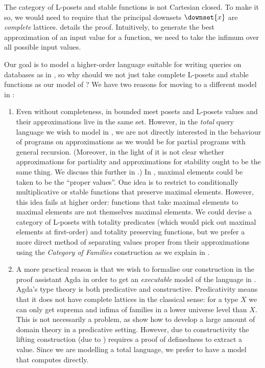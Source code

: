 The category of L-posets and stable functions is not Cartesian
closed. To make it so, we would need to require that the principal
downsets $\downset{x}$ are \emph{complete} lattices. \citet[Theorem
12.5.10]{amadio-curien} details the proof. Intuitively, to generate
the best approximation of an input value for a function, we need to
take the infimum over all possible input values.

Our goal is to model a higher-order language suitable for writing
queries on databases as in , so why should
we not just take complete L-posets and stable functions as our model
of \GPS?  We have two reasons for moving to a different model in
:

\begin{enumerate}[leftmargin=*]
\item Even without completeness, in bounded meet posets and L-posets
  values and their approximations live in the same set. However, in
  the \emph{total} query language we wish to model in
  , we are not directly interested in the behaviour
  of programs on approximations as we would be for partial programs
  with general recursion. (Moreover, in the light of
   it is not clear whether
  approximations for partiality and approximations for stability ought
  to be the same thing. We discuss this further in
  .) In ,
  maximal elements could be taken to be the ``proper values''. One
  idea is to restrict to conditionally multiplicative or stable
  functions that preserve maximal elements. However, this idea fails
  at higher order: functions that take maximal elements to maximal
  elements are not themselves maximal elements. We could devise a
  category of L-posets with totality predicates (which would pick out
  maximal elements at first-order) and totality preserving functions,
  but we prefer a more direct method of separating values proper from
  their approximations using the \emph{Category of Families}
  construction as we explain in .
\item A more practical reason is that we wish to formalise our
  construction in the proof assistant Agda \cite{agda} in order to get
  an \emph{executable} model of the language in
  . Agda's type theory is both predicative and
  constructive. Predicativity means that it does not have complete
  lattices in the classical sense: for a type $X$ we can only get
  suprema and infima of families in a lower universe level than
  $X$. This is not necessarily a problem, as \citet{dejong21} show how
  to develop a large amount of domain theory in a predicative
  setting. However, due to constructivity the lifting construction
  (due to \citet{escardo-knapp}) requires a proof of definedness to
  extract a value. Since we are modelling a total language, we prefer
  to have a model that computes directly.
\end{enumerate}

